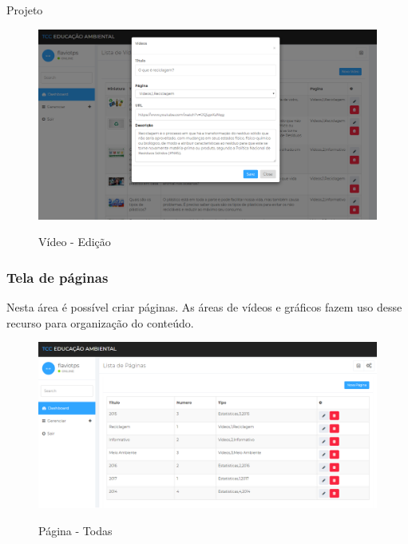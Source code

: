\documentclass[
	12pt,				%
	openany,			%
	twoside,			%
	a4paper,			%
	english,			%
	french,				%
	spanish,			%
	brazil				%
	]{abntex2}
\begin{document}
\begin{chapter}{Projeto}
\begin{figure}[h]
\centering
   \caption{Vídeo - Edição}
   \includegraphics[scale=0.40]{media/tela_video_site_2.png}
     \label{fig:tela_video_site_2}
\end{figure}

\newpage
\subsubsection{Tela de páginas} \label{tela_paginas}
Nesta área é possível criar páginas. As áreas de vídeos e gráficos fazem uso desse recurso para organização do conteúdo.

\begin{figure}[h]
\centering
   \caption{Página - Todas}
   \includegraphics[scale=0.40]{media/tela_pagina_site_1.png}
     \label{fig:tela_pagina_site_1}
\end{figure}


\end{chapter}
\end{document}
